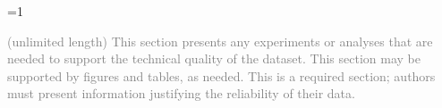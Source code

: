 \documentclass[fleqn,10pt]{wlscirep}
\newcommand{\ifinstruction}{0} %
\begin{document}
\begin{table}

\caption{\label{tbl-CCF-replicate-staging-acquisition}Comparison of CCF means and standard deviations across different replicates, stagings, and acquisition settings.}


\end{table}%

\ifnum \ifinstruction=1

\textcolor{gray}{(unlimited length) This section presents any experiments or analyses that are needed to support the technical quality of the dataset. This section may be supported by figures and tables, as needed. This is a required section; authors must present information justifying the reliability of their data.}
\end{document}
